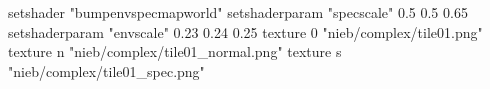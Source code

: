 setshader "bumpenvspecmapworld"
setshaderparam "specscale" 0.5 0.5 0.65
setshaderparam "envscale"  0.23 0.24 0.25
    texture 0 "nieb/complex/tile01.png"
    texture n "nieb/complex/tile01_normal.png"
    texture s "nieb/complex/tile01_spec.png"